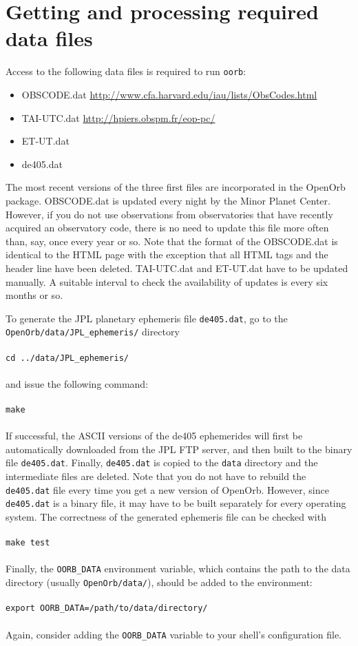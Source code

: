 \documentclass[12pt,english,twoside,a4paper]{report}
\begin{document}
\section{Getting and processing required data files}

Access to the following data files is required to run \verb|oorb|: 
\begin{itemize}
  \item OBSCODE.dat \href{http://www.cfa.harvard.edu/iau/lists/ObsCodes.html}{http://www.cfa.harvard.edu/iau/lists/ObsCodes.html}
  \item TAI-UTC.dat \href{http://hpiers.obspm.fr/eop-pc/}{http://hpiers.obspm.fr/eop-pc/}
  \item ET-UT.dat \href{}{}
  \item de405.dat
\end{itemize}
The most recent versions of the three first files are incorporated in
the OpenOrb package. OBSCODE.dat is updated every night by the Minor
Planet Center. However, if you do not use observations from
observatories that have recently acquired an observatory code, there
is no need to update this file more often than, say, once every year
or so. Note that the format of the OBSCODE.dat is identical to the
HTML page with the exception that all HTML tags and the header line
have been deleted. TAI-UTC.dat and ET-UT.dat have to be updated
manually. A suitable interval to check the availability of updates is
every six months or so.

To generate the JPL planetary ephemeris file \verb|de405.dat|, go to
the \\ \verb|OpenOrb/data/JPL_ephemeris/| directory \\ \\ 
\verb|cd ../data/JPL_ephemeris/| \\ \\ 
and issue the following command: \\ \\ 
\verb|make| \\ \\
If successful, the ASCII versions of the de405 ephemerides will first
be automatically downloaded from the JPL FTP server, and then built to
the binary file \verb|de405.dat|. Finally, \verb|de405.dat| is copied
to the \verb|data| directory and the intermediate files are
deleted. Note that you do not have to rebuild the \verb|de405.dat|
file every time you get a new version of OpenOrb. However, since
\verb|de405.dat| is a binary file, it may have to be built separately
for every operating system. The correctness of the generated ephemeris
file can be checked with \\ \\
\verb|make test| \\ \\
Finally, the \verb|OORB_DATA| environment variable, which contains the
path to the data directory (usually \verb|OpenOrb/data/|), should be
added to the environment: \\ \\
\verb|export OORB_DATA=/path/to/data/directory/| \\ \\
Again, consider adding the \verb|OORB_DATA| variable to your shell's
configuration file. 
\end{document}
